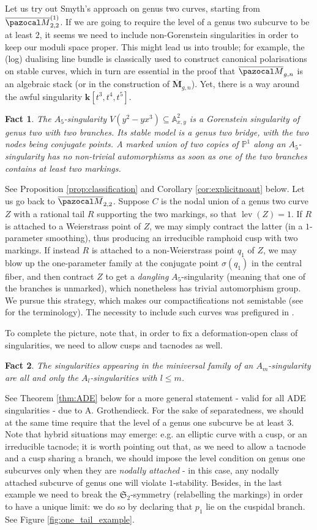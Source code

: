\documentclass[11pt]{amsart}
\newcommand{\PP}{\mathbb P}
\renewcommand{\k}{\mathbf k}
\newcommand{\Aaff}{\mathbb A}
\newcommand{\oM}{\overline{\pazocal M}}
\newcommand{\lev}{\operatorname{lev}}
\theoremstyle{plain}
\newtheorem*{fact}{Fact}
\theoremstyle{definition}
\begin{document}
Let us try out Smyth's approach on genus two curves, starting from $\oM_{2,2}^{(1)}$. If we are going to require the level of a genus two subcurve to be at least $2$, it seems we need to include non-Gorenstein singularities in order to keep our moduli space proper. This might lead us into trouble; for example, the (log) dualising line bundle is classically used to construct canonical polarisations on stable curves, which in turn are essential in the proof that $\oM_{g,n}$ is an algebraic stack (or in the construction of $\overline{\mathbf M}_{g,n}$). Yet, there is a way around the awful singularity $\k[t^3,t^4,t^5]$.
\begin{fact}
 The $A_5$-singularity $V(y^2-yx^3)\subseteq\Aaff^2_{x,y}$ is a Gorenstein singularity of genus two with two branches. Its stable model is a genus two bridge, with the two nodes being conjugate points. A marked union of two copies of $\PP^1$ along an $A_5$-singularity has no non-trivial automorphisms as soon as one of the two branches contains at least two markings.
\end{fact}
See Proposition \ref{prop:classification} and Corollary \ref{cor:explicitnoaut} below. Let us go back to $\oM_{2,2}$. Suppose $C$ is the nodal union of a genus two curve $Z$ with a rational tail $R$ supporting the two markings, so that $\lev(Z)=1$. If $R$ is attached to a Weierstrass point of $Z$, we may simply contract the latter (in a $1$-parameter smoothing), thus producing an irreducible ramphoid cusp with two markings. If instead $R$ is attached to a non-Weierstrass point $q_1$ of $Z$, we may blow up the one-parameter family at the conjugate point $\sigma(q_1)$ in the central fiber, and then contract $Z$ to get a \emph{dangling} $A_5$-singularity (meaning that one of the branches is unmarked), which nonetheless has trivial automorphism group. We pursue this strategy, which makes our compactifications not semistable (see \cite[Definition 1.2]{SMY-towards} for the terminology). The necessity to include such curves was prefigured in \cite{AFSGm}.

To complete the picture, note that, in order to fix a deformation-open class of singularities, we need to allow cusps and tacnodes as well.
\begin{fact}
 The singularities appearing in the miniversal family of an $A_m$-singularity are all and only the $A_l$-singularities with $l\leq m$.
\end{fact}
See Theorem \ref{thm:ADE} below for a more general statement - valid for all ADE singularities - due to A. Grothendieck. For the sake of separatedness, we should at the same time require that the level of a genus one subcurve be at least $3$. Note that hybrid situations may emerge: e.g. an elliptic curve with a cusp, or an irreducible tacnode; it is worth pointing out that, as we need to allow a tacnode and a cusp sharing a branch, we should impose the level condition on genus one subcurves only when they are \emph{nodally attached} - in this case, any nodally attached subcurve of genus one will violate $1$-stability. Besides, in the last example we need to break the $\mathfrak S_2$-symmetry (relabelling the markings) in order to have a unique limit: we do so by declaring that $p_1$ lie on the cuspidal branch. See Figure \ref{fig:one_tail_example}.
\end{document}
